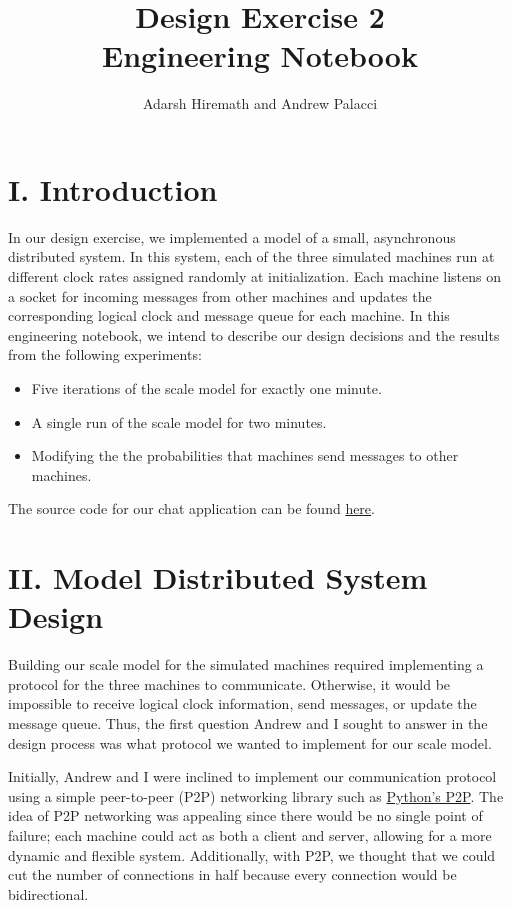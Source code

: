 \documentclass[
	a4paper, %
	10pt, %
	unnumberedsections, %
	twoside, %
]{LTJournalArticle}
\title{Design Exercise 2\\ Engineering Notebook} %
\author{%
	Adarsh Hiremath and Andrew Palacci
}
\begin{document}
\maketitle %


\section{I. Introduction}
In our design exercise, we implemented a model of a small, asynchronous distributed system. In this system, each of the three simulated machines run at different clock rates assigned randomly at initialization. Each machine listens on a socket for incoming messages from other machines and updates the corresponding logical clock and message queue for each machine. In this engineering notebook, we intend to describe our design decisions and the results from the following experiments:
\begin{itemize}
    \item Five iterations of the scale model for exactly one minute. 
    \item A single run of the scale model for two minutes.
    \item Modifying the the probabilities that machines send messages to other machines. 
\end{itemize}

The source code for our chat application can be found \href{https://github.com/andrewp2303/logical_clocks}{here}.

\section{II. Model Distributed System Design}

Building our scale model for the simulated machines required implementing a protocol for the three machines to communicate. Otherwise, it would be impossible to receive logical clock information, send messages, or update the message queue. Thus, the first question Andrew and I sought to answer in the design process was what protocol we wanted to implement for our scale model. 

Initially, Andrew and I were inclined to implement our communication protocol using a simple peer-to-peer (P2P) networking library such as \href{https://pypi.org/project/pyp2p/}{Python's P2P}. The idea of P2P networking was appealing since there would be no single point of failure;  each machine could act as both a client and server, allowing for a more dynamic and flexible system. Additionally, with P2P, we thought that we could cut the number of connections in half because every connection would be bidirectional. 
\end{document}
